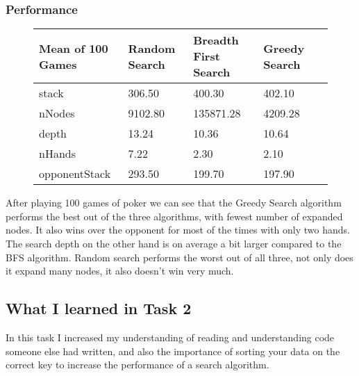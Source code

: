 \documentclass{article}
\begin{document}
\subsubsection{Performance}
\begin{figure}[H]
    \center
    \begin{tabular}{llllr}
        \toprule
        {Mean of 100 Games} & {Random Search} & {Breadth First Search} & {Greedy Search}  \\
        \midrule
        stack         &   306.50 &     400.30 &   402.10 \\ 
        nNodes        &  9102.80 &  135871.28 &  4209.28 \\
        depth         &    13.24 &      10.36 &    10.64 \\
        nHands        &     7.22 &       2.30 &     2.10 \\
        opponentStack &   293.50 &     199.70 &   197.90 \\
        \bottomrule
    \end{tabular}
       
\end{figure}
After playing 100 games of poker we can see that the Greedy Search algorithm performs the best
out of the three algorithms, with fewest number of expanded nodes. It also wins over the opponent
for most of the times with only two hands. The search depth on the other hand is on average a bit
larger compared to the BFS algorithm. Random search performs the worst out of all three, not only
does it expand many nodes, it also doesn't win very much.

\subsection{What I learned in Task 2}
In this task I increased my understanding of reading and understanding code someone else had written,
and also the importance of sorting your data on the correct key to increase the performance of a search algorithm.
\end{document}
